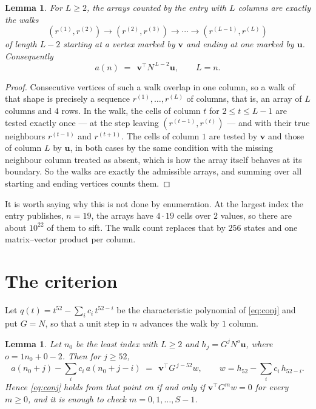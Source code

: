 \documentclass[11pt,a4paper]{article}
\theoremstyle{plain}
\newtheorem{lemma}[theorem]{Lemma}
\theoremstyle{definition}
\begin{document}
\begin{lemma}\label{lem:walk}
For $L\ge2$, the arrays counted by the entry with $L$ columns are exactly the walks
\[
(r^{(1)},r^{(2)})\to(r^{(2)},r^{(3)})\to\cdots\to(r^{(L-1)},r^{(L)})
\]
of length $L-2$ starting at a vertex marked by $\mathbf{v}$ and ending at one marked by
$\mathbf{u}$. Consequently
\[
a(n)\;=\;\,\mathbf{v}^{\!\top}N^{\,L-2}\mathbf{u},\qquad L=n .
\]
\end{lemma}

\begin{proof}
Consecutive vertices of such a walk overlap in one column, so a walk of that shape is
precisely a sequence $r^{(1)},\dots,r^{(L)}$ of columns, that is, an array of $L$ columns
and $4$ rows. In the walk, the cells of column $t$ for $2\le t\le L-1$ are tested
exactly once --- at the step leaving $(r^{(t-1)},r^{(t)})$ --- and with their true
neighbours $r^{(t-1)}$ and $r^{(t+1)}$. The cells of column $1$ are tested by
$\mathbf{v}$ and those of column $L$ by $\mathbf{u}$, in both cases by the same condition
with the missing neighbour column treated as absent, which is how the array itself behaves at
its boundary. So the walks are exactly the admissible arrays, and summing over all starting
and ending vertices counts them.
\end{proof}


It is worth saying why this is not done by enumeration. At the largest index the entry
publishes, $n=19$, the arrays have $4\cdot19$ cells over
$2$ values, so there are about $10^{22}$ of them to sift. The
walk count replaces that by $256$ states and one matrix--vector product per column.
\section{The criterion}

Let $q(t)=t^{52}-\sum_i c_i\,t^{52-i}$ be the characteristic polynomial of
\eqref{eq:conj} and put $G=N$, so that a unit step in $n$ advances the walk by
$1$ column.

\begin{lemma}\label{lem:crit}
Let $n_0$ be the least index with $L\ge2$ and $h_j=G^{j}N^{o}\mathbf{u}$, where
$o=1n_0+0-2$. Then for $j\ge52$,
\[
a(n_0+j)-\sum_i c_i\,a(n_0+j-i)\;=\;\,\mathbf{v}^{\!\top}G^{\,j-52}w,
\qquad w=h_{52}-\sum_i c_i\,h_{52-i} .
\]
Hence \eqref{eq:conj} holds from that point on if and only if
$\mathbf{v}^{\!\top}G^{m}w=0$ for every $m\ge0$, and it is enough to check
$m=0,1,\dots,S-1$.
\end{lemma}
\end{document}
